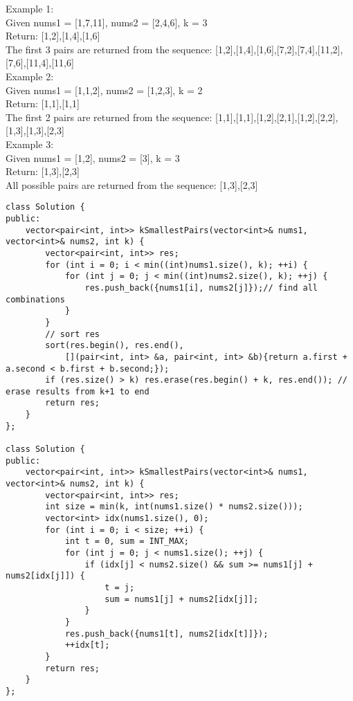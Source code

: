 Example 1:\\
Given nums1 = [1,7,11], nums2 = [2,4,6],  k = 3\\
Return: [1,2],[1,4],[1,6]\\
The first 3 pairs are returned from the sequence:
[1,2],[1,4],[1,6],[7,2],[7,4],[11,2],[7,6],[11,4],[11,6]\\

Example 2:\\
Given nums1 = [1,1,2], nums2 = [1,2,3],  k = 2\\
Return: [1,1],[1,1]\\
The first 2 pairs are returned from the sequence:
[1,1],[1,1],[1,2],[2,1],[1,2],[2,2],[1,3],[1,3],[2,3]\\

Example 3:\\
Given nums1 = [1,2], nums2 = [3],  k = 3 \\
Return: [1,3],[2,3]\\
All possible pairs are returned from the sequence:
[1,3],[2,3]\\

\begin{lstlisting}
class Solution {
public:
    vector<pair<int, int>> kSmallestPairs(vector<int>& nums1, vector<int>& nums2, int k) {
        vector<pair<int, int>> res;
        for (int i = 0; i < min((int)nums1.size(), k); ++i) {
            for (int j = 0; j < min((int)nums2.size(), k); ++j) {
                res.push_back({nums1[i], nums2[j]});// find all combinations
            }
        }
        // sort res
        sort(res.begin(), res.end(), 
            [](pair<int, int> &a, pair<int, int> &b){return a.first + a.second < b.first + b.second;});
        if (res.size() > k) res.erase(res.begin() + k, res.end()); // erase results from k+1 to end
        return res;
    }
};

class Solution {
public:
    vector<pair<int, int>> kSmallestPairs(vector<int>& nums1, vector<int>& nums2, int k) {
        vector<pair<int, int>> res;
        int size = min(k, int(nums1.size() * nums2.size()));
        vector<int> idx(nums1.size(), 0);
        for (int i = 0; i < size; ++i) {
            int t = 0, sum = INT_MAX;
            for (int j = 0; j < nums1.size(); ++j) {
                if (idx[j] < nums2.size() && sum >= nums1[j] + nums2[idx[j]]) {
                    t = j;
                    sum = nums1[j] + nums2[idx[j]];
                }
            }
            res.push_back({nums1[t], nums2[idx[t]]});
            ++idx[t];
        }
        return res;
    }
};
\end{lstlisting}


